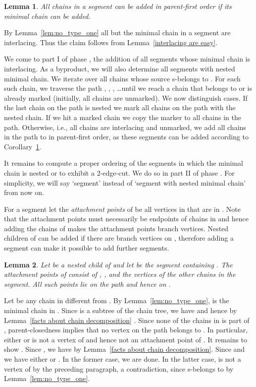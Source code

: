 \documentclass[paper=a4]{scrartcl}
\newtheorem{lemma}{Lemma}
\newcommand{\qed}{}
\newcommand{\mqed}{\hfill}
\newlength{\proofpostskipamount}\newlength{\proofpreskipamount}
\newenvironment{proof}{\par\vspace{\proofpreskipamount}\noindent{\textbf{Proof:}}\hspace{0.5em}}{\nopagebreak \strut\nopagebreak \hspace{\fill}\mqed\par\vspace{\proofpostskipamount}\noindent}
\begin{document}
\begin{lemma}\label{cor:add_segment} All chains in a segment  can be added in parent-first order if its minimal chain can be added.
\end{lemma}
\begin{proof} By Lemma~\ref{lem:no_type_one} all but the minimal chain in a segment are interlacing. Thus the claim follows from Lemma~\ref{interlacing are easy}. \qed
\end{proof}

We come to part I of phase , the addition of all segments whose minimal chain is interlacing. As a byproduct, we will also determine all segments with nested minimal chain. We iterate over all chains  whose source  s-belongs to . For each such chain, we traverse the path , , , \ldots until we reach a chain that belongs to  or is already marked (initially, all chains are unmarked). We now distinguish cases. If the last chain on the path is nested we mark all chains on the path with the nested chain. If we hit a marked chain we copy the marker to all chains in the path.  Otherwise, i.e., all chains are interlacing and unmarked, we add all chains in the path to  in parent-first order, as these segments can be added according to Corollary~\ref{cor:add_segment}. 

It remains to compute a proper ordering of the segments in which the minimal chain is nested or to exhibit a 2-edge-cut. We do so in part II of phase . For simplicity, we will say `segment' instead of `segment with nested minimal chain' from now on.

For a segment  let the \emph{attachment points} of  be all vertices in  that are in . Note that the attachment points must necessarily be endpoints of chains in  and hence adding the chains of  makes the attachment points branch vertices. Nested children  of  can be added if there are branch vertices on , therefore adding a segment can make it possible to add further segments.

\begin{lemma}\label{prop:attachment points} Let  be a nested child of  and let  be the segment containing . The attachment points of  consist of , , and the vertices  of the other chains in the segment. All such points lie on the path  and hence on . \end{lemma} 
\begin{proof} Let  be any chain in  different from . By Lemma~\ref{lem:no_type_one},  is the minimal chain in . Since  is a subtree of the chain tree, we have  and hence by Lemma~\ref{facts about chain decomposition} . Since none of the chains in  is part of , parent-closedness implies that no vertex on the path  belongs to . In particular, either  or  is not a vertex of  and hence not an attachment point of . It remains to show . Since , we have  by Lemma~\ref{facts about chain decomposition}. Since  and  we have either  or . In the former case, we are done. In the latter case,  is not a vertex of  by the preceding paragraph, a contradiction, since  s-belongs to  by Lemma~\ref{lem:no_type_one}.
\qed
\end{proof}
\end{document}
